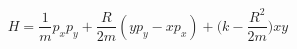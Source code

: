 \begin{equation}
H=\frac{1}{ m} p_xp_y + \frac{R}{2m} (yp_y-xp_x) + 
	\bigl( k - \frac{R^2}{2m} \bigr) xy
\label{eq:Hint}
\end{equation}

